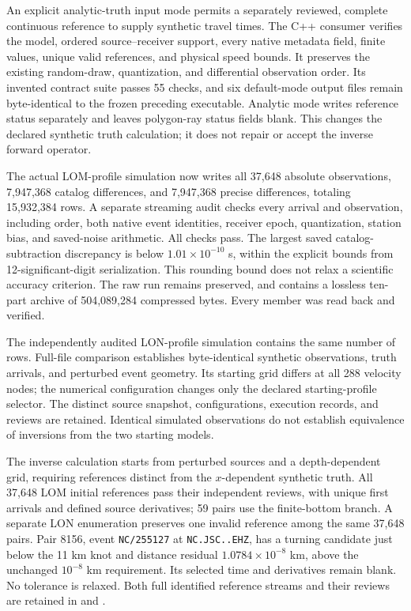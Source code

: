 An explicit analytic-truth input mode permits a separately reviewed,
complete continuous reference to supply synthetic travel times. The C++
consumer verifies the model, ordered source--receiver support, every native
metadata field, finite values, unique valid references, and physical speed
bounds. It preserves the existing random-draw, quantization, and differential
observation order. Its invented contract suite passes 55 checks, and six
default-mode output files remain byte-identical to the frozen preceding
executable. Analytic mode writes reference status separately and leaves
polygon-ray status fields blank. This changes the declared synthetic truth
calculation; it does not repair or accept the inverse forward operator.

The actual LOM-profile simulation now writes all 37,648 absolute observations,
7,947,368 catalog differences, and 7,947,368 precise differences, totaling
15,932,384 rows. A separate streaming audit checks every arrival and observation,
including order, both native event identities, receiver epoch, quantization,
station bias, and saved-noise arithmetic. All checks pass. The largest saved
catalog-subtraction discrepancy is below $1.01\times10^{-10}$ s, within the explicit
bounds from 12-significant-digit serialization. This rounding bound does not
relax a scientific accuracy criterion. The raw run remains preserved, and
 contains a lossless ten-part archive
of 504,089,284 compressed bytes. Every member was read back and verified.

The independently audited LON-profile simulation contains the same number of
rows. Full-file comparison establishes byte-identical synthetic observations,
truth arrivals, and perturbed event geometry. Its starting grid differs at all
288 velocity nodes; the numerical configuration changes only the declared
starting-profile selector. The distinct source snapshot, configurations,
execution records, and reviews are retained. Identical simulated observations
do not establish equivalence of inversions from the two starting models.

The inverse calculation starts from perturbed sources and a depth-dependent
grid, requiring references distinct from the $x$-dependent synthetic truth.
All 37,648 LOM initial references pass their independent reviews, with unique
first arrivals and defined source derivatives; 59 pairs use the finite-bottom
branch. A separate LON enumeration preserves one invalid reference among the
same 37,648 pairs. Pair 8156, event \texttt{NC/255127} at
\texttt{NC.JSC..EHZ}, has a turning candidate just below the 11 km knot and
distance residual $1.0784\times10^{-8}$ km, above the unchanged
$10^{-8}$ km requirement. Its selected time and derivatives remain blank.
No tolerance is relaxed. Both full identified reference streams and their
reviews are retained in
 and
.

